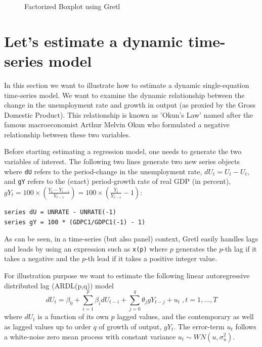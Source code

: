\documentclass[11pt]{article}
\begin{document}
\begin{figure}[h!]
	\centering
	\caption{Factorized Boxplot using Gretl}
	\label{fig:Plot2}
\end{figure}



\section{Let's estimate a dynamic time-series model}
In this section we want to illustrate how to estimate a dynamic single-equation time-series model. We want to examine the dynamic relationship between the change in the unemployment rate and growth in output (as proxied by the Gross Domestic Product). This relationship is known as 'Okun's Law' named after the famous macroeconomist Arthur Melvin Okun who formulated a negative relationship between these two variables.

Before starting estimating a regression model, one needs to generate the two variables of interest. The following two lines generate two new series objects where \texttt{dU} refers to the period-change in the unemployment rate, $ dU_t = U_t - U_t $, and \texttt{gY} refers to the (exact) period-growth rate of real GDP (in percent), $ gY_t =  100 \times \left( \frac{Y_t-Y_{t-1}}{Y_{t-1}}\right) = 100 \times \left( \frac{Y_t}{Y_{t-1}}-1 \right)$:
\begin{Verbatim}[baselinestretch=0.75]
series dU = UNRATE - UNRATE(-1)
series gY = 100 * (GDPC1/GDPC1(-1) - 1)
\end{Verbatim}
As can be seen, in a time-series (but also panel) context, Gretl easily handles lags and leads by using an expression such as \texttt{x(p)} where $ p $ generates the $ p $-th lag if it takes a negative and the $ p $-th lead if it takes a positive integer value.

For illustration purpose we want to estimate the following linear autoregressive distributed lag (ARDL(p,q)) model
\begin{equation}
	\label{eq:ardl}
	dU_t = \beta_0 + \sum_{i=1}^{p} \beta_i dU_{t-i} + \sum_{j=0}^{q} \theta_j gY_{t-j} + u_t\; , t=1, \ldots, T
\end{equation}
where $ dU_t $ is a function of its own $ p $ lagged values, and the contemporary as well as lagged values up to order $ q $ of growth of output, $ gY_t $. The error-term $ u_t $ follows a white-noise zero mean process with constant variance $ u_t \sim WN(u, \sigma^2_u) $.
\end{document}
